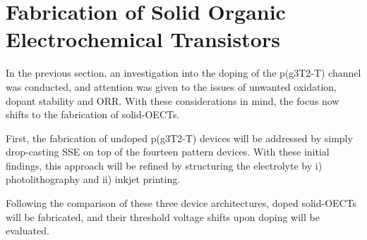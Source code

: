 

\section{Fabrication of Solid Organic Electrochemical Transistors}

In the previous section, an investigation into the doping of the p(g3T2-T) channel was conducted, and attention was given to the issues of unwanted oxidation, dopant stability and ORR. With these considerations in mind, the focus now shifts to the fabrication of solid-OECTs. 

First, the fabrication of undoped p(g3T2-T) devices will be addressed by simply drop-casting SSE on top of the fourteen pattern devices. With these initial findings, this approach will be refined by structuring the electrolyte by i) photolithography \cite{weissbachPhotopatternableSolidElectrolyte2022} and ii) inkjet printing. 

Following the comparison of these three device architectures, doped solid-OECTs will be fabricated, and their threshold voltage shifts upon doping will be evaluated. %

